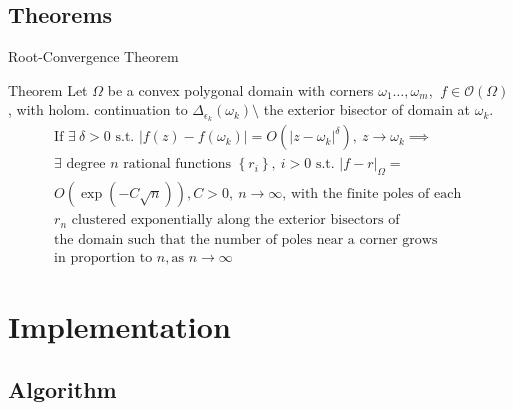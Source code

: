 \documentclass[envcountsect notes]{beamer}       %
\newcommand{\hol}[1]{\mathcal{O}\left(#1\right)}
\begin{document}
\subsection{Theorems}
\begin{frame}{Root-Convergence Theorem}
    \begin{block}{Theorem}
        Let $\Omega$ be a convex polygonal domain with corners $\omega_1\dots,\omega_m$, 
        $\ f \in\hol{\Omega}$, with holom. continuation to $\Delta_{\epsilon_k}(\omega_k) \setminus $ the exterior bisector of domain at $\omega_k$.
        \begin{gather*}
            \text{If }\exists\ \delta > 0 \text{ s.t. }\lvert f(z) - f(\omega_k) \rvert  = O(\lvert z - \omega_k\rvert^\delta),\ z \rightarrow \omega_k \implies \\ 
            \exists\text{ degree }n\text{ rational functions }\left\{ r_i \right\},\ i > 0 \text{ s.t. }
            \lvert f - r\rvert_\Omega = \\
            O(\exp(-C\sqrt{n})), C > 0,\ n \rightarrow \infty \text{, with the finite poles of each } \\
            r_n \text{ clustered exponentially along the exterior bisectors of }\\
            \text{the domain such that the number of poles near a corner grows }\\
            \text{in proportion to } n,\text{as } n \rightarrow \infty
        \end{gather*}
        
    \end{block}
\end{frame}


\section{Implementation}

\subsection{Algorithm}
\end{document}
